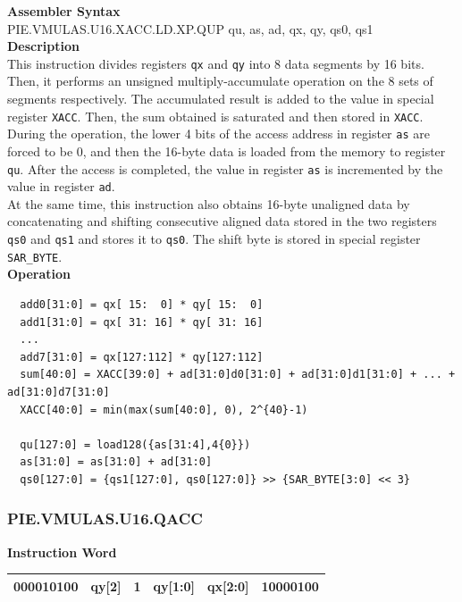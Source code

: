 \textbf{Assembler Syntax} \\
PIE.VMULAS.U16.XACC.LD.XP.QUP qu, as, ad, qx, qy, qs0, qs1 \\
\textbf{Description} \\
This instruction divides registers \lstinline{qx} and \lstinline{qy} into 8 data segments by 16 bits. Then, it performs an unsigned multiply-accumulate operation on the 8 sets of segments respectively. The accumulated result is added to the value in special register \lstinline{XACC}. Then, the sum obtained is saturated and then stored in \lstinline{XACC}.\\
During the operation, the lower 4 bits of the access address in register \lstinline{as} are forced to be 0, and then the 16-byte data is loaded from the memory to register \lstinline{qu}. After the access is completed, the value in register \lstinline{as} is incremented by the value in register \lstinline{ad}.\\
At the same time, this instruction also obtains 16-byte unaligned data by concatenating and shifting consecutive aligned data stored in the two registers \lstinline{qs0} and \lstinline{qs1} and stores it to \lstinline{qs0}. The shift byte is stored in special register \lstinline{SAR_BYTE}.\\
\textbf{Operation}
\begin{lstlisting}
  add0[31:0] = qx[ 15:  0] * qy[ 15:  0]
  add1[31:0] = qx[ 31: 16] * qy[ 31: 16]
  ...
  add7[31:0] = qx[127:112] * qy[127:112]
  sum[40:0] = XACC[39:0] + ad[31:0]d0[31:0] + ad[31:0]d1[31:0] + ... + ad[31:0]d7[31:0]
  XACC[40:0] = min(max(sum[40:0], 0), 2^{40}-1)

  qu[127:0] = load128({as[31:4],4{0}})
  as[31:0] = as[31:0] + ad[31:0]
  qs0[127:0] = {qs1[127:0], qs0[127:0]} >> {SAR_BYTE[3:0] << 3}
\end{lstlisting}

\newpage
\subsubsection{PIE.VMULAS.U16.QACC}\label{instruction:PIEVMULASU16QACC}
\setlength\tabcolsep{6pt}
\textbf{Instruction Word} \\
\begin{tabular}{|c|c|c|c|c|c|}
	\hline
	000010100 & qy[2] & 1 & qy[1:0] & qx[2:0] & 10000100 \\
	\hline
\end{tabular}

